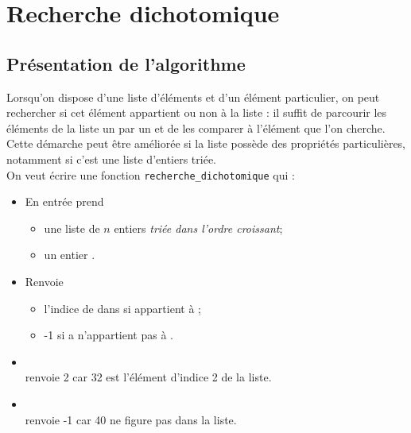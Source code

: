 \chapter{Recherche dichotomique}

\section{Présentation de l'algorithme}
Lorsqu'on dispose d'une liste d'éléments et d'un élément particulier, on peut rechercher si cet élément appartient ou non à la liste : il suffit de parcourir les éléments de la liste un par un et de les comparer à l'élément que l'on cherche. Cette démarche peut être améliorée si la liste possède des propriétés particulières, notamment si c'est une liste d'entiers triée.\\

On veut écrire une fonction \texttt{recherche\_dichotomique} qui :
\begin{itemize}
    \item   En entrée prend \begin{itemize}
                                \item   une liste  de $n$ entiers \textit{triée dans l'ordre croissant};
                                \item   un entier .
                            \end{itemize}
    \item  Renvoie \begin{itemize}
                        \item   l'indice de  dans  si  appartient à ;
                        \item   -1 si a n'appartient pas à .
                    \end{itemize} 
\end{itemize}

\begin{exemple}[]
\begin{itemize}
    \item   {} \\renvoie 2 car 32 est l'élément d'indice 2 de la liste.
    \item   {} \\renvoie -1 car 40 ne figure pas dans la liste.
\end{itemize}
\end{exemple}

